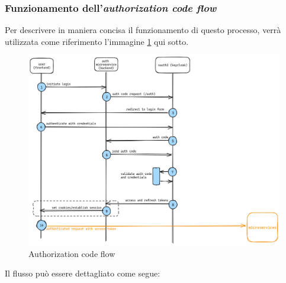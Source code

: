 \subsubsection{Funzionamento dell'\textit{authorization code flow}}
Per descrivere in maniera concisa il funzionamento di questo processo, verrà utilizzata come riferimento l'immagine \ref{fig:auth-code-flow} qui sotto.
\begin{figure}[h]
    \centering
    \includegraphics[width=1\textwidth]{files/images/auth-code-flow.png}
    \caption{Authorization code flow}
    \label{fig:auth-code-flow}
\end{figure}
\newline
Il flusso può essere dettagliato come segue:
